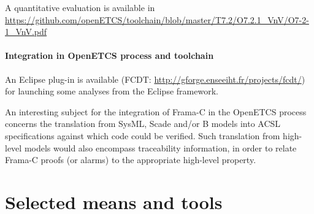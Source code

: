 A quantitative evaluation is available in \url{https://github.com/openETCS/toolchain/blob/master/T7.2/O7.2.1_VnV/O7-2-1_VnV.pdf}

\paragraph{Integration in OpenETCS process and toolchain}

An Eclipse plug-in is available 
(FCDT: \url{http://gforge.enseeiht.fr/projects/fcdt/}) for launching some
analyses from the Eclipse framework.

An interesting subject for the integration of Frama-C in the OpenETCS process
concerns the translation from SysML, Scade and/or B models into ACSL
specifications against which code could be verified. Such translation from
high-level models would also encompass traceability information, in order to
relate Frama-C proofs (or alarms) to the appropriate high-level property.

\section{Selected means and tools}

\begin{comment}
To complete after decision meeting with a section for each tool with the following contents:

\begin{itemize}
\item description of the means or tools, references and links
\item added value for openETCS
\item for which tasks and how (input/output/actions) is the mean or tools used.
\end{itemize}
\end{comment}
